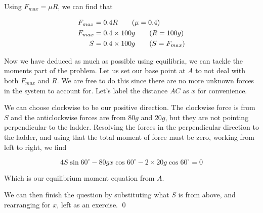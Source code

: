 \begin{solution}
    Using $F_{max} = \mu R$, we can find that 

    \begin{align*}
        F_{max} &= 0.4 R \tag{$\mu = 0.4$} \\
        F_{max} &= 0.4 \times 100g \tag{$R = 100g$} \\
        S &= 0.4 \times 100g \tag{$S = F_{max}$}
    \end{align*}

    Now we have deduced as much as possible using equilibria, we can tackle the moments part of the problem. Let us set our base point at $A$ to not deal with both $F_{max}$ and $R$. We are free to do this since there are no more unknown forces in the system to account for.
    Let's label the distance $AC$ as $x$ for convenience.

    We can choose clockwise to be our positive direction. The clockwise force is from $S$ and the anticlockwise forces are from $80g$ and $20g$, but they are not pointing perpendicular to the ladder.
    Resolving the forces in the perpendicular direction to the ladder, and using that the total moment of force must be zero, working from left to right, we find

    \[ 4 S \sin60^\circ - 80gx \cos 60^\circ - 2 \times 20g \cos 60^\circ = 0\]

    Which is our equilibrium moment equation from $A$.

    We can then finish the question by substituting what $S$ is from above, and rearranging for $x$, left as an exercise.
    \qed
\end{solution}

